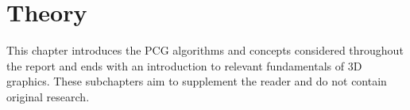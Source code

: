 \chapter{Theory}

This chapter introduces the PCG algorithms and concepts considered throughout the report and ends with an introduction to relevant fundamentals of 3D graphics.
These subchapters aim to supplement the reader and do not contain original research.






